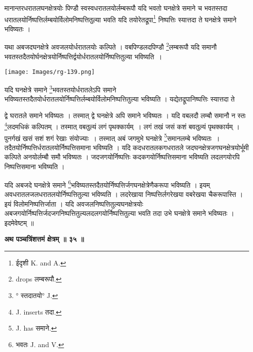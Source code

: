 \documentclass[11pt, openany]{book}
\begin{document}
{\ab मानान्तरधरातलघनक्षेत्रयोः पिण्डौ स्वस्वधरातलयोर्लम्बरूपौ यदि भवतो घनक्षेत्रे समाने च भवतस्तदा धरातलयोर्निष्पत्तिर्लम्बयोर्विलोमनिष्पत्तितुल्या भवति यदि तयोरेतद्रूपा\renewcommand{\thefootnote}{२}\footnote{ईदृशी {\en K. and A.}} निष्पत्तिः स्यात्तदा ते घनक्षेत्रे समाने भविष्यतः ।}\\
\vspace{3mm}

 यथा अबजदघनक्षेत्रे अवजलयोर्धरातलयोः कल्पिते । वबपिण्डलदपिण्डौ \renewcommand{\thefootnote}{३}\footnote{{\en drops} लम्बरूपौ.}लम्बरूपौ यदि समानौ भवतस्तदैतयोर्घनक्षेत्रयोर्निष्पत्तिर्द्वयोर्धरातलयोर्निष्पत्तितुल्या भविष्यति~।
 \begin{center}
 \texttt{[image: Images/rg-139.png]}  
 \end{center}
 यदि घनक्षेत्रे समाने \renewcommand{\thefootnote}{४}\footnote{° स्तदातयो° {\en J.}}भवतस्तयोर्धरातलेऽपि समाने भविष्यतस्तदैतयोर्धरातलयोर्निष्पत्तिर्लम्बयोर्विलोमनिष्पत्तितुल्या भविष्यति । यद्येतद्रूपानिष्पत्तिः स्यात्तदा ते

\newpage
\noindent द्वे घरातले समाने भविष्यतः । तस्मात् द्वे घनक्षेत्रे अपि समाने भविष्यतः । यदि वबलदौ लम्बौ समानौ न स्तः \renewcommand{\thefootnote}{१}\footnote{{\en J. inserts} तदा.}लदमधिकं कल्पितम् । तस्मात् वबतुल्यं लगं पृथक्कार्यम्~। लगं तखं जसं कशं बवतुल्यं पृथक्कार्यम् । पुनर्गखं खसं सशं शगं रेखाः संयोज्याः~। तस्मात् अबं जगमुभे घनक्षेत्रे \renewcommand{\thefootnote}{२}\footnote{{\en J. has} समाने.}समानलम्बे भविष्यतः~। तदैतयोर्निष्पत्तिर्धरातलयोर्निष्पत्तिसमाना भविष्यति । यदि कदधरातलकगधरातले जदघनक्षेत्रजगघनक्षेत्रयोर्भूमी कल्पिते अनयोर्लम्बौ समौ भविष्यतः । जदजगयोर्निष्पत्तिः कदकगयोर्निष्पत्तिसमाना भविष्यति लदलगयोरपि निष्पत्तिसमाना भविष्यति ।\\
\vspace{5mm}

यदि अबजदे घनक्षेत्रे समाने \renewcommand{\thefootnote}{३}\footnote{भवतः {\en J. and V.}}भविष्यतस्तदैतयोर्निष्पत्तिर्जगघनक्षेत्रेणैकरूपा भविष्यति । इयम् अवधरातलजलधरातलयोर्निष्पत्तितुल्या भविष्यति । लदरेखाया निष्पत्तिर्लगरेखया वबरेखया चैकरूपास्ति । इयं विलोमनिष्पत्तिर्जाता । यदि अवजलनिष्पत्तितुल्यघनक्षेत्रयोः अबजगयोर्निष्पत्तिर्जदजगनिष्पत्तितुल्यलदलगयोर्निष्पत्तितुल्या भवति तदा उभे घनक्षेत्रे समाने भविष्यतः । इदमेवेष्टम् ॥\\
\vspace{5mm}

\begin{center}
\textbf{\large अथ पञ्चत्रिंशत्तमं क्षेत्रम् ॥ ३५ ॥}
\end{center}
\vspace{5mm}
\end{document}
